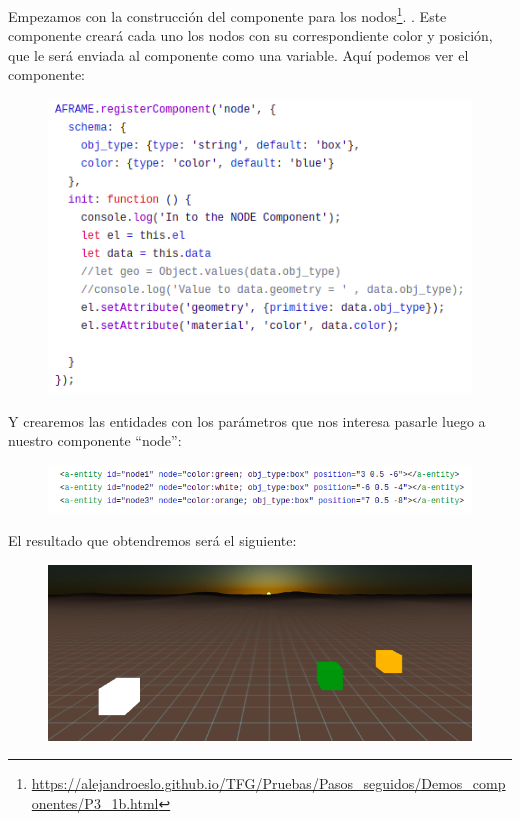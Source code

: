 \documentclass[a4paper, 12pt]{book}
\begin{document}
Empezamos con la construcción del componente para los nodos\footnote{\url{https://alejandroeslo.github.io/TFG/Pruebas/Pasos_seguidos/Demos_componentes/P3_1b.html}}.
. Este componente creará cada uno los nodos con su correspondiente color y posición, que le será enviada al componente como una variable. Aquí podemos ver el componente:

\begin{figure}[h]
\centering
    \includegraphics[scale=0.6]{img/node1.png}
\end{figure}

Y crearemos las entidades con los parámetros que nos interesa pasarle luego a nuestro componente “node”:


\begin{figure}[h]
\centering
    \includegraphics[scale=0.5]{img/node2.png}
\end{figure}

El resultado que obtendremos será el siguiente:

\begin{figure}[h]
\centering
    \includegraphics[scale=0.44]{img/componenteNODE.png}
\end{figure}
\end{document}
